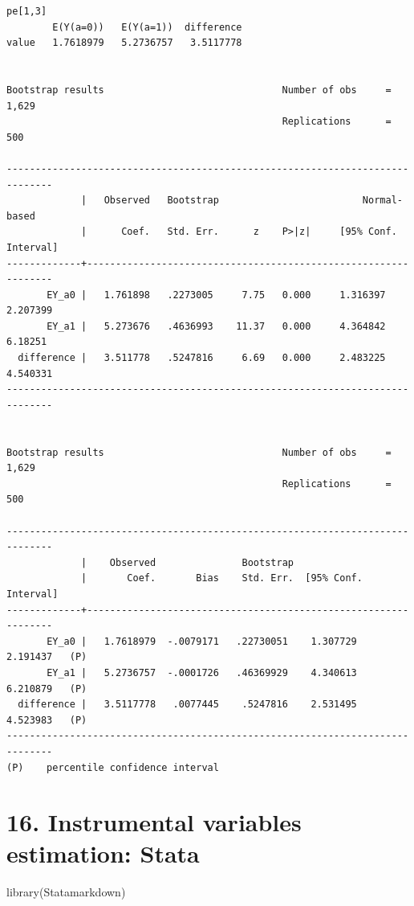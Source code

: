 \documentclass[
  10pt,
]{book}
\newenvironment{Shaded}{\begin{snugshade}}{\end{snugshade}}
\newcommand{\FunctionTok}[1]{\textcolor[rgb]{0.00,0.00,0.00}{#1}}
\newcommand{\NormalTok}[1]{#1}
\begin{document}
\begin{verbatim}
pe[1,3]
        E(Y(a=0))   E(Y(a=1))  difference
value   1.7618979   5.2736757   3.5117778


Bootstrap results                               Number of obs     =      1,629
                                                Replications      =        500

------------------------------------------------------------------------------
             |   Observed   Bootstrap                         Normal-based
             |      Coef.   Std. Err.      z    P>|z|     [95% Conf. Interval]
-------------+----------------------------------------------------------------
       EY_a0 |   1.761898   .2273005     7.75   0.000     1.316397    2.207399
       EY_a1 |   5.273676   .4636993    11.37   0.000     4.364842     6.18251
  difference |   3.511778   .5247816     6.69   0.000     2.483225    4.540331
------------------------------------------------------------------------------


Bootstrap results                               Number of obs     =      1,629
                                                Replications      =        500

------------------------------------------------------------------------------
             |    Observed               Bootstrap
             |       Coef.       Bias    Std. Err.  [95% Conf. Interval]
-------------+----------------------------------------------------------------
       EY_a0 |   1.7618979  -.0079171   .22730051    1.307729   2.191437   (P)
       EY_a1 |   5.2736757  -.0001726   .46369929    4.340613   6.210879   (P)
  difference |   3.5117778   .0077445    .5247816    2.531495   4.523983   (P)
------------------------------------------------------------------------------
(P)    percentile confidence interval
\end{verbatim}

\hypertarget{instrumental-variables-estimation-stata}{%
\chapter*{16. Instrumental variables estimation: Stata}\label{instrumental-variables-estimation-stata}}

\begin{Shaded}
\begin{Highlighting}[]
\FunctionTok{library}\NormalTok{(Statamarkdown)}
\end{Highlighting}
\end{Shaded}
\end{document}
